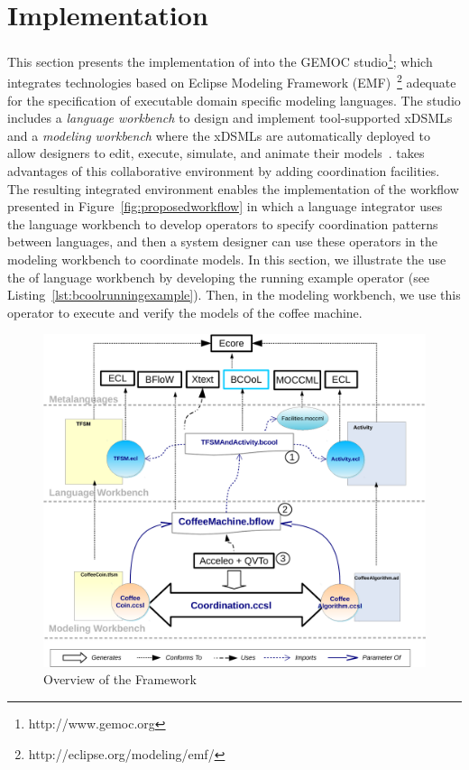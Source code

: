 \section{Implementation}
\label{section:bcoollengbench}
This section presents the implementation of \bcool into the GEMOC studio\footnote{http://www.gemoc.org}; which integrates technologies based on Eclipse Modeling Framework (EMF)~\footnote{http://eclipse.org/modeling/emf/} adequate for the specification of executable domain specific modeling languages. The studio includes a \emph{language workbench} to design and implement tool-supported xDSMLs and a \emph{modeling workbench} where the xDSMLs are automatically deployed to allow designers to edit, execute, simulate, and animate their models~\cite{ttc15bib}. \bcool takes advantages of this collaborative environment by adding coordination facilities. The resulting integrated environment enables the implementation of the workflow presented in Figure~\ref{fig:proposedworkflow} in which a language integrator uses the language workbench to develop \bcool operators to specify coordination patterns between languages, and then a system designer can use these operators in the modeling workbench to  coordinate models. In this section, we illustrate the use the of language workbench by developing the running example operator (see Listing~\ref{lst:bcoolrunningexample}). Then, in the modeling workbench, we use this operator to execute and verify the models of the coffee machine. 

\begin{figure}[]
	\begin{center}
		\includegraphics[width=1\textwidth]{bcool/figs/bcooltechnos}
		\caption{Overview of the \bcool Framework}
		\label{fig:bcooltechnos}
	\end{center}
\end{figure}

